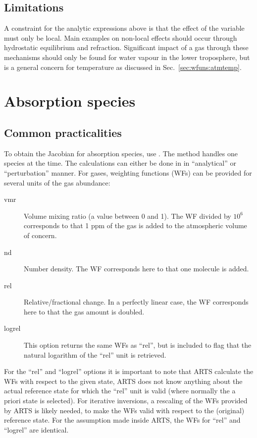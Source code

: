 \subsection{Limitations}
\label{sec:wfuns:atmvars:limit}
%
A constraint for the analytic expressions above is that the effect of the
variable must only be local. Main examples on non-local effects should occur
through hydrostatic equilibrium and refraction. Significant impact of a gas
through these mechanisms should only be found for water vapour in the lower
troposphere, but is a general concern for temperature as discussed in
Sec.~\ref{sec:wfuns:atmtemp}.





\section{Absorption species}
\label{sec:wfuns:absspecies}

\subsection{Common practicalities}
%
To obtain the Jacobian for absorption species, use
. The method handles one species at the time.
The calculations can either be done in in ``analytical'' or ``perturbation''
manner. For gases, weighting functions (WFs) can be provided for several units
of the gas abundance:
\begin{description}
\item[vmr] Volume mixing ratio (a value between 0 and 1). The WF divided by
  $10^6$ corresponds to that 1 ppm of the gas is added to the atmospheric
  volume of concern.
\item[nd] Number density. The WF corresponds here to that one molecule is added.
\item[rel] Relative/fractional change. In a perfectly linear case, the WF
  corresponds here to that the gas amount is doubled.
\item[logrel] This option returns the same WFs as ``rel'', but is included to
  flag that the natural logarithm of the ``rel'' unit is retrieved.
\end{description}
For the ``rel'' and ``logrel'' options it is important to note that ARTS
calculate the WFs with respect to the given state, ARTS does not know anything
about the actual reference state for which the ``rel'' unit is valid (where
normally the a priori state is selected). For iterative inversions, a rescaling
of the WFs provided by ARTS is likely needed, to make the WFs valid with
respect to the (original) reference state. For the assumption made inside ARTS,
the WFs for ``rel'' and ``logrel'' are identical.

